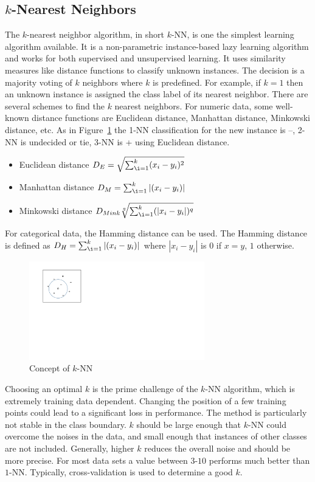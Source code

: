 \subsection*{$k$-Nearest Neighbors}
The $k$-nearest neighbor algorithm, in short $k$-NN, is one the simplest learning algorithm available. It is a non-parametric instance-based lazy learning algorithm and works for both supervised and unsupervised learning. It uses similarity measures like distance functions to classify unknown instances. The decision is a majority voting of  $k$ neighbors where $k$ is predefined. For example, if $k= 1$ then an unknown instance is assigned the class label of its nearest neighbor. There are several schemes to find the $k$ nearest neighbors. For numeric data, some well-known distance functions are Euclidean distance, Manhattan distance, Minkowski distance, etc.  As in Figure~\ref{fig:bg:knn} the 1-NN classification for the new instance is {--}, 2-NN is undecided or tie, 3-NN is {+} using Euclidean distance.
\begin{itemize}
    \item Euclidean distance $D_E = \sqrt{\sum_{\i =1 }^{k} (x_i - y_i)^2}$
    \item Manhattan distance $D_M = \sum_{\i =1 }^{k} |(x_i - y_i)|$
    \item Minkowski distance $D_{Mink}\sqrt[q]{\sum_{\i =1 }^{k} (|x_i - y_i|)^q}$
\end{itemize}
For categorical data, the Hamming distance can be used. The Hamming distance is defined as $D_H = \sum_{\i =1 }^{k} |(x_i - y_i)|$ where $|x_i - y_i|$ is $0$ if $x=y$, $1$ otherwise.

\begin{figure}[htbp]
    \begin{center}
        \includegraphics[width=3.0in]{figs/knn.pdf}
        \caption{Concept of $k$-NN}
        \label{fig:bg:knn}
    \end{center}
\end{figure}

Choosing an optimal $k$ is the prime challenge of the $k$-NN algorithm, which is extremely training data dependent. Changing the position of a few training points could lead to a significant loss in performance. The method is particularly not stable in the class boundary. $k$ should be large enough that $k$-NN could overcome the noises in the data, and small enough that instances of other classes are not included. Generally, higher $k$ reduces the overall noise and should be more precise. For most data sets a value between $3$-$10$ performs much better than $1$-NN. Typically, cross-validation is used to determine a good $k$. 

